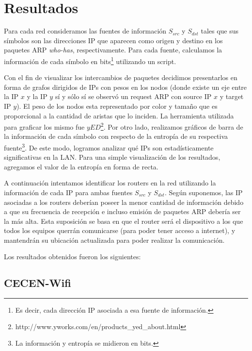 \documentclass[10pt, a4paper]{article}
\begin{document}
\section{Resultados}

Para cada red consideramos las fuentes de información $S_{src}$ y $S_{dst}$ tales que sus símbolos son las direcciones IP que aparecen como origen y destino en los paquetes ARP \textit{who-has}, respectivamente. Para cada fuente, calculamos la información de cada símbolo en bits\footnote{Es decir, cada dirección IP asociada a esa fuente de información.} utilizando un script.

Con el fin de visualizar los intercambios de paquetes decidimos presentarlos en forma de grafos dirigidos de IPs con pesos en los nodos (donde existe un eje entre la IP $x$ y la IP $y$ sí y sólo sí se observó un request ARP con source IP $x$ y target IP $y$). El peso de los nodos esta representado por color y tamaño que es proporcional a la cantidad de aristas que lo inciden. %
La herramienta utilizada para graficar los mismo fue $yED$\footnote{http://www.yworks.com/en/products\_yed\_about.html}.
Por otro lado, realizamos gráficos de barra de la información de cada símbolo con respecto de la entropía de su respectiva fuente\footnote{La información y entropía se midieron en bits.}. De este modo, logramos analizar qué IPs son estadísticamente significativas en la LAN. Para una simple visualización de los resultados, agregamos el valor de la entropía en forma de recta.

A continuación intentamos identificar los routers en la red utilizando la información de cada IP para ambas fuentes $S_{src}$ y $S_{dst}$. Según suponemos, las IP asociadas a los routers deberían poseer la menor cantidad de información debido a que su frecuencia de recepción e incluso emisión de paquetes ARP debería ser la más alta. Esta suposición se basa en que el router será el dispositivo a los que todos los equipos querrán comunicarse (para poder tener acceso a internet), y mantendrán su ubicación actualizada para poder realizar la comunicación.

Los resultados obtenidos fueron los siguientes:

\newpage
\subsection{CECEN-Wifi}
\end{document}
